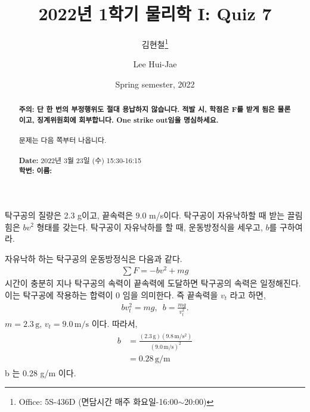 \documentclass[floatfix,nofootinbib,superscriptaddress,fleqn,preprint]{revtex4}
\begin{document}
\title{\Large 2022년 1학기 물리학 I: Quiz 7}
\author{김현철\footnote{Office: 5S-436D (면담시간 매주
    화요일-16:00$\sim$20:00)}} 
\author{Lee Hui-Jae} 
\date{Spring semester, 2022}


\vspace{1.cm}
\begin{abstract}
\noindent \textbf{ {\color{red}주의}: \color{blue} 단 한 번의 부정행위도 절대
  용납하지 않습니다. 적발 시, 학점은 F를 받게 됨은 물론이고,
  징계위원회에 회부합니다. One strike out임을 명심하세요.}\\
\\
문제는 다음 쪽부터 나옵니다.  \\ \\
{\bf Date:} 2022년 3월 23일 (수) 15:30-16:15 
\\
{\bf 학번:} \hspace{4cm}
{\bf 이름:} 

\end{abstract}
\maketitle

탁구공의 질량은 2.3 g이고, 끝속력은 $9.0$ m/s이다. 탁구공이 자유낙하할
때 받는 끌림힘은 $bv^2$ 형태를 갖는다. 탁구공이 자유낙하를 할 때,
운동방정식을 세우고, $b$를 구하여라.  


자유낙하 하는 탁구공의 운동방정식은 다음과 같다.
\begin{align}
  \sum F = -bv^2+mg
\end{align}
시간이 충분히 지나 탁구공의 속력이 끝속력에 도달하면 탁구공의 속력은 
일정해진다. 이는 탁구공에 작용하는 합력이 0 임을 의미한다. 즉 끝속력을
$v_t$ 라고 하면,
\begin{align}
  bv_t^2 = mg,\,\,\, b =\frac{mg}{v_t^2}.
\end{align}
$m = 2.3\,\mathrm{g}$, $v_t = 9.0\,\mathrm{m/s}$ 이다. 따라서,
\begin{align}
  \begin{split}
    b &= \frac{(2.3\,\mathrm{g})(9.8\,\mathrm{m/s^2})}{( 9.0\,\mathrm{m/s})^2}  \\
    &= 0.28\,\mathrm{g/m}
  \end{split}
  \end{align}
  b 는 0.28 g/m 이다.
\vspace{1.cm}
\end{document}
